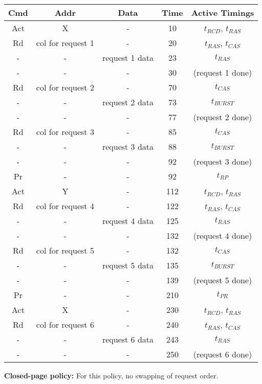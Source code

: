 \documentclass[a4paper, 11pt]{exam}
\begin{document}
\begin{enumerate}
\begin{center}
	\begin{tabular}{|c|c|c|c|c|}
		\hline
		\textbf{Cmd} & \textbf{Addr} & \textbf{Data} & \textbf{Time} & \textbf{Active Timings}\\
		\hline
		Act & X & - & 10 & $t_{RCD}$, $t_{RAS}$\\ 
		\hline
		Rd & col for request 1 & - & 20 &  $t_{RAS}$, $t_{CAS}$\\
		\hline
		- & - & request 1 data & 23 & $t_{RAS}$ \\
		\hline
		- & - & - & 30 & (request 1 done)\\
		\hline
		Rd & col for request 2 & - & 70 & $t_{CAS}$ \\
		\hline
		- & - & request 2 data & 73 & $t_{BURST}$ \\
		\hline
		- & - & - & 77 & (request 2 done) \\
		\hline
		Rd & col for request 3 & - & 85 & $t_{CAS}$ \\
		\hline
		- & - & request 3 data & 88 & $t_{BURST}$ \\
		\hline
		- & - & - & 92 & (request 3 done) \\
		\hline
		Pr & - & - & 92 & $t_{RP}$ \\
		\hline
		Act & Y & - & 112 & $t_{RCD}$, $t_{RAS}$ \\
		\hline
		Rd & col for request 4 & - & 122 & $t_{RAS}$, $t_{CAS}$ \\
		\hline
		- & - & request 4 data & 125 & $t_{RAS}$ \\
		\hline
		- & - & - & 132 & (request 4 done) \\
		\hline
		Rd & col for request 5 & - & 132 & $t_{CAS}$ \\
		\hline
		- & - & request 5 data & 135 & $t_{BURST}$ \\
		\hline
		- & - & - & 139 & (request 5 done) \\
		\hline
		Pr & - & - & 210 & $t_{PR}$ \\
		\hline
		Act & X & - & 230 & $t_{RCD}$, $t_{RAS}$ \\
		\hline
		Rd & col for request 6 & - & 240 & $t_{RAS}$, $t_{CAS}$ \\
		\hline
		- & - & request 6 data & 243 & $t_{RAS}$ \\
		\hline
		- & - & - & 250 & (request 6 done) \\
		\hline
	\end{tabular}
\end{center}

\textbf{Closed-page policy:} For this policy, no swapping of request order.


\end{enumerate}
\end{document}
